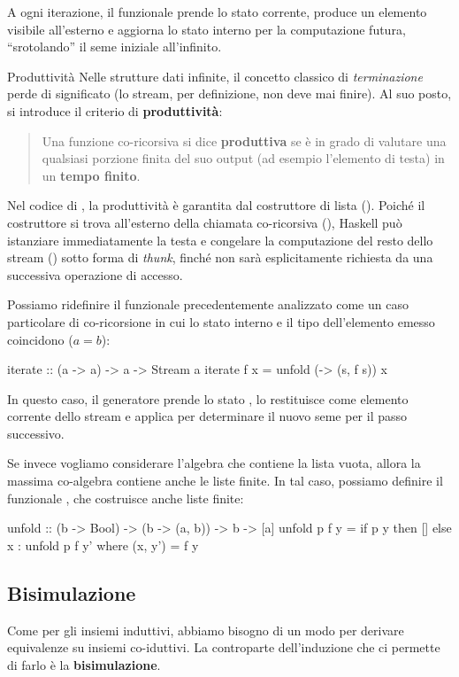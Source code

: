 A ogni iterazione, il funzionale prende lo stato corrente, produce un elemento visibile all'esterno e aggiorna lo stato interno per la computazione futura, ``srotolando'' il seme iniziale all'infinito.

\begin{gframe}{Produttività}
Nelle strutture dati infinite, il concetto classico di \textit{terminazione} perde di significato (lo stream, per definizione, non deve mai finire). Al suo posto, si introduce il criterio di \textbf{produttività}:
\begin{quote}
    Una funzione co-ricorsiva si dice \textbf{produttiva} se è in grado di valutare una qualsiasi porzione finita del suo output (ad esempio l'elemento di testa) in un \textbf{tempo finito}.
\end{quote}

Nel codice di , la produttività è garantita dal costruttore di lista (\code{:}). Poiché il costruttore si trova all'esterno della chiamata co-ricorsiva (), Haskell può istanziare immediatamente la testa  e congelare la computazione del resto dello stream () sotto forma di \textit{thunk}, finché non sarà esplicitamente richiesta da una successiva operazione di accesso.
\end{gframe}

Possiamo ridefinire il funzionale  precedentemente analizzato come un caso particolare di co-ricorsione in cui lo stato interno e il tipo dell'elemento emesso coincidono ($a = b$):
\begin{haskellbox}{}
iterate :: (a -> a) -> a -> Stream a
iterate f x = unfold (\s -> (s, f s)) x
\end{haskellbox}
In questo caso, il generatore prende lo stato , lo restituisce come elemento corrente dello stream e applica  per determinare il nuovo seme per il passo successivo.

Se invece vogliamo considerare l'algebra che contiene la lista vuota, allora la massima co-algebra contiene anche le liste finite. In tal caso, possiamo definire il funzionale , che costruisce anche liste finite:
\begin{haskellbox}{}
unfold :: (b -> Bool) -> (b -> (a, b)) -> b -> [a]
unfold p f y = if p y then []
            else x : unfold p f y' where (x, y') = f y
\end{haskellbox}

\subsection{Bisimulazione}
Come per gli insiemi induttivi, abbiamo bisogno di un modo per derivare equivalenze su insiemi co-iduttivi. La controparte dell'induzione che ci permette di farlo è la \textbf{bisimulazione}.


